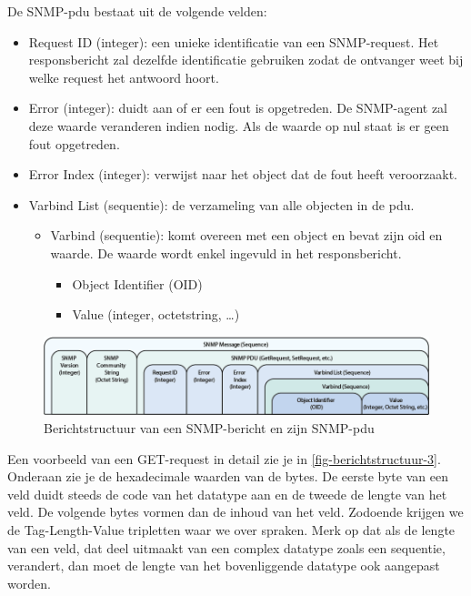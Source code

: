 De SNMP-\gls{pdu} bestaat uit de volgende velden:

\begin{itemize}
	\item Request ID (integer): een unieke identificatie van een SNMP-request.
		Het responsbericht zal dezelfde identificatie gebruiken zodat de ontvanger weet bij welke request het antwoord hoort.
	\item Error (integer): duidt aan of er een fout is opgetreden.
		De SNMP-agent zal deze waarde veranderen indien nodig. Als de waarde op nul staat is er geen fout opgetreden.
	\item Error Index (integer): verwijst naar het object dat de fout heeft veroorzaakt.
	\item Varbind List (sequentie): de verzameling van alle objecten in de \gls{pdu}.
		\begin{itemize}
			\item Varbind (sequentie): komt overeen met een object en bevat zijn \gls{oid} en waarde.
				De waarde wordt enkel ingevuld in het responsbericht.
				\begin{itemize}
					\item Object Identifier (OID)
					\item Value (integer, octetstring, \ldots)
				\end{itemize}
		\end{itemize}
\end{itemize}

\begin{figure}[h]
	\centering
	\includegraphics[scale=0.45]{figures/snmp/berichtstructuur-2}
	\caption[Berichtstructuur van een SNMP-bericht en zijn SNMP-PDU]{Berichtstructuur van een SNMP-bericht en zijn SNMP-\gls{pdu}\cite{snmp-message-format}}
	\label{fig-berichtstructuur-2}
\end{figure}

Een voorbeeld van een GET-request in detail zie je in \cref{fig-berichtstructuur-3}.
Onderaan zie je de hexadecimale waarden van de bytes.
De eerste byte van een veld duidt steeds de code van het datatype aan en de tweede de lengte van het veld.
De volgende bytes vormen dan de inhoud van het veld.
Zodoende krijgen we de Tag-Length-Value tripletten waar we over spraken.
Merk op dat als de lengte van een veld, dat deel uitmaakt van een complex datatype zoals een sequentie, verandert,
dan moet de lengte van het bovenliggende datatype ook aangepast worden.

